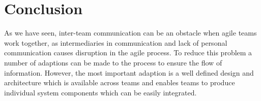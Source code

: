 \section{Conclusion}\label{sec:conclusion}
As we have seen, inter-team communication can be an obstacle when agile teams work together, as intermediaries in communication and lack of personal communication causes disruption in the agile process.
To reduce this problem a number of adaptions can be made to the process to ensure the flow of information.
However, the most important adaption is a well defined design and architecture which is available across teams and enables teams to produce individual system components which can be easily integrated.